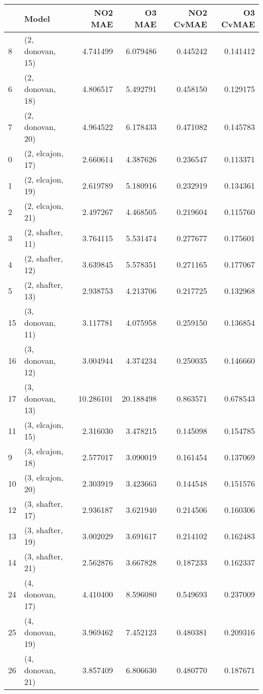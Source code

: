 \begin{tabular}{llrrrr}
\toprule
{} &             Model &    NO2 MAE &     O3 MAE &  NO2 CvMAE &  O3 CvMAE \\
\midrule
8  &  (2, donovan, 15) &   4.741499 &   6.079486 &   0.445242 &  0.141412 \\
6  &  (2, donovan, 18) &   4.806517 &   5.492791 &   0.458150 &  0.129175 \\
7  &  (2, donovan, 20) &   4.964522 &   6.178433 &   0.471082 &  0.145783 \\
0  &  (2, elcajon, 17) &   2.660614 &   4.387626 &   0.236547 &  0.113371 \\
1  &  (2, elcajon, 19) &   2.619789 &   5.180916 &   0.232919 &  0.134361 \\
2  &  (2, elcajon, 21) &   2.497267 &   4.468505 &   0.219604 &  0.115760 \\
3  &  (2, shafter, 11) &   3.764115 &   5.531474 &   0.277677 &  0.175601 \\
4  &  (2, shafter, 12) &   3.639845 &   5.578351 &   0.271165 &  0.177067 \\
5  &  (2, shafter, 13) &   2.938753 &   4.213706 &   0.217725 &  0.132968 \\
15 &  (3, donovan, 11) &   3.117781 &   4.075958 &   0.259150 &  0.136854 \\
16 &  (3, donovan, 12) &   3.004944 &   4.374234 &   0.250035 &  0.146660 \\
17 &  (3, donovan, 13) &  10.286101 &  20.188498 &   0.863571 &  0.678543 \\
11 &  (3, elcajon, 15) &   2.316030 &   3.478215 &   0.145098 &  0.154785 \\
9  &  (3, elcajon, 18) &   2.577017 &   3.090019 &   0.161454 &  0.137069 \\
10 &  (3, elcajon, 20) &   2.303919 &   3.423663 &   0.144548 &  0.151576 \\
12 &  (3, shafter, 17) &   2.936187 &   3.621940 &   0.214506 &  0.160306 \\
13 &  (3, shafter, 19) &   3.002029 &   3.691617 &   0.214102 &  0.162483 \\
14 &  (3, shafter, 21) &   2.562876 &   3.667828 &   0.187233 &  0.162337 \\
24 &  (4, donovan, 17) &   4.410400 &   8.596080 &   0.549693 &  0.237009 \\
25 &  (4, donovan, 19) &   3.969462 &   7.452123 &   0.480381 &  0.209316 \\
26 &  (4, donovan, 21) &   3.857409 &   6.806630 &   0.480770 &  0.187671 \\

\end{tabular}
